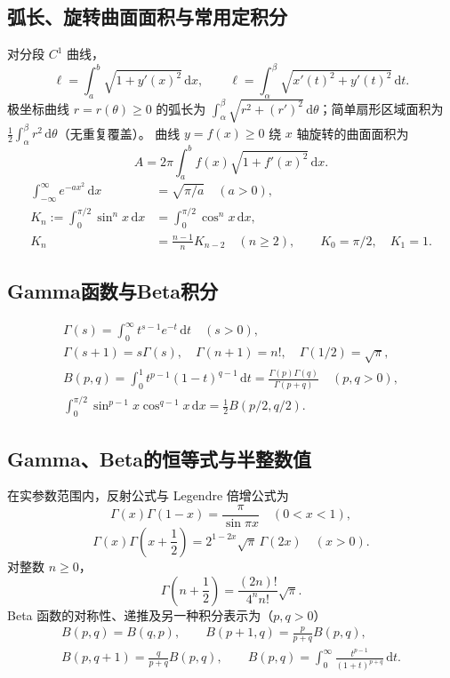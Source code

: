 \documentclass[../main.tex]{subfiles}
\begin{document}
\subsection{弧长、旋转曲面面积与常用定积分}
对分段 $C^1$ 曲线，
\[
\ell=\int_a^b\sqrt{1+y'(x)^2}\,\mathrm dx,\qquad
\ell=\int_\alpha^\beta\sqrt{x'(t)^2+y'(t)^2}\,\mathrm dt.
\]
极坐标曲线 $r=r(\theta)\ge0$ 的弧长为 $\int_\alpha^\beta\sqrt{r^2+(r')^2}\,\mathrm d\theta$；简单扇形区域面积为 $\frac12\int_\alpha^\beta r^2\,\mathrm d\theta$（无重复覆盖）。
曲线 $y=f(x)\ge0$ 绕 $x$ 轴旋转的曲面面积为
\[
A=2\pi\int_a^b f(x)\sqrt{1+f'(x)^2}\,\mathrm dx.
\]
\begin{align*}
\int_{-\infty}^{\infty}e^{-ax^2}\,\mathrm dx&=\sqrt{\pi/a}\quad(a>0),\\
K_n:=\int_0^{\pi/2}\sin^n x\,\mathrm dx
&=\int_0^{\pi/2}\cos^n x\,\mathrm dx,\\
K_n&=\frac{n-1}{n}K_{n-2}\quad(n\ge2),\qquad K_0=\pi/2,\quad K_1=1.
\end{align*}
\subsection{Gamma函数与Beta积分}
\begin{gather*}
\Gamma(s)=\int_0^\infty t^{s-1}e^{-t}\,\mathrm dt\quad(s>0),\\
\Gamma(s+1)=s\Gamma(s),\quad\Gamma(n+1)=n!,\quad\Gamma(1/2)=\sqrt\pi,\\
B(p,q)=\int_0^1t^{p-1}(1-t)^{q-1}\,\mathrm dt
=\frac{\Gamma(p)\Gamma(q)}{\Gamma(p+q)}\quad(p,q>0),\\
\int_0^{\pi/2}\sin^{p-1}x\cos^{q-1}x\,\mathrm dx=\tfrac12B(p/2,q/2).
\end{gather*}
\subsection{Gamma、Beta的恒等式与半整数值}
在实参数范围内，反射公式与 Legendre 倍增公式为
\[
\Gamma(x)\Gamma(1-x)=\frac\pi{\sin\pi x}\quad(0<x<1),
\]
\[
\Gamma(x)\Gamma\!\left(x+\frac12\right)
=2^{1-2x}\sqrt\pi\,\Gamma(2x)\quad(x>0).
\]
对整数 $n\ge0$，
\[
\Gamma\!\left(n+\frac12\right)
=\frac{(2n)!}{4^nn!}\sqrt\pi.
\]
Beta 函数的对称性、递推及另一种积分表示为（$p,q>0$）
\begin{gather*}
B(p,q)=B(q,p),\qquad
B(p+1,q)=\frac p{p+q}B(p,q),\\
B(p,q+1)=\frac q{p+q}B(p,q),\qquad
B(p,q)=\int_0^\infty\frac{t^{p-1}}{(1+t)^{p+q}}\,\mathrm dt.
\end{gather*}
\end{document}

